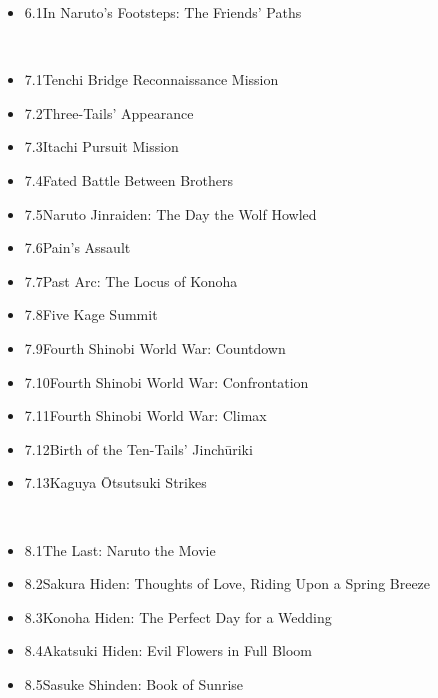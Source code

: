 \documentclass[a4paper,12pt]{article}
\begin{document}
\begin{itemize}
\item 6.1In Naruto's Footsteps: The Friends' Paths
\end{itemize}\\ \par \vspace{0.5cm}

\begin{itemize}
\item 7.1Tenchi Bridge Reconnaissance Mission
\item 7.2Three-Tails' Appearance
\item 7.3Itachi Pursuit Mission
\item 7.4Fated Battle Between Brothers
\item 7.5Naruto Jinraiden: The Day the Wolf Howled
\item 7.6Pain's Assault
\item 7.7Past Arc: The Locus of Konoha
\item 7.8Five Kage Summit
\item 7.9Fourth Shinobi World War: Countdown
\item 7.10Fourth Shinobi World War: Confrontation
\item 7.11Fourth Shinobi World War: Climax
\item 7.12Birth of the Ten-Tails' Jinchūriki
\item 7.13Kaguya Ōtsutsuki Strikes
\end{itemize}\\ \par \vspace{0.5cm}

\begin{itemize}
\item 8.1The Last: Naruto the Movie
\item 8.2Sakura Hiden: Thoughts of Love, Riding Upon a Spring Breeze
\item 8.3Konoha Hiden: The Perfect Day for a Wedding
\item 8.4Akatsuki Hiden: Evil Flowers in Full Bloom
\item 8.5Sasuke Shinden: Book of Sunrise
\end{itemize}\\ \par \vspace{0.5cm}
\end{document}
